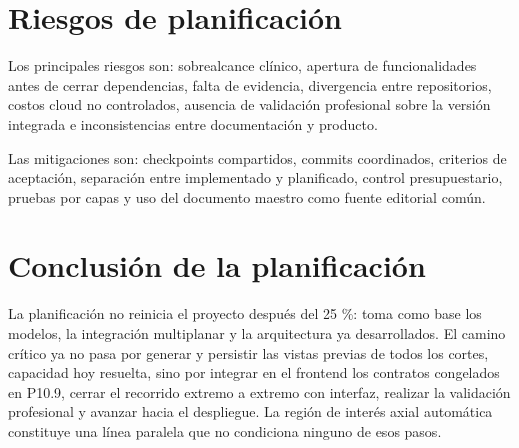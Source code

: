 \section{Riesgos de planificación}

Los principales riesgos son: sobrealcance clínico, apertura de funcionalidades antes de cerrar dependencias, falta de evidencia, divergencia entre repositorios, costos cloud no controlados, ausencia de validación profesional sobre la versión integrada e inconsistencias entre documentación y producto.

Las mitigaciones son: checkpoints compartidos, commits coordinados, criterios de aceptación, separación entre implementado y planificado, control presupuestario, pruebas por capas y uso del documento maestro como fuente editorial común.

\section{Conclusión de la planificación}

La planificación no reinicia el proyecto después del 25 \%: toma como base los modelos, la integración multiplanar y la arquitectura ya desarrollados. El camino crítico ya no pasa por generar y persistir las vistas previas de todos los cortes, capacidad hoy resuelta, sino por integrar en el frontend los contratos congelados en P10.9, cerrar el recorrido extremo a extremo con interfaz, realizar la validación profesional y avanzar hacia el despliegue. La región de interés axial automática constituye una línea paralela que no condiciona ninguno de esos pasos.
